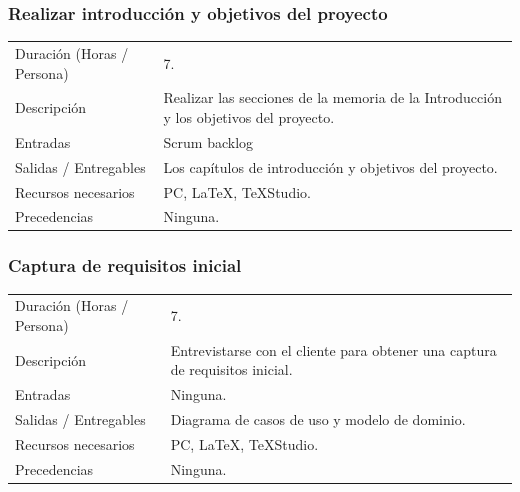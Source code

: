 \subsubsection{Realizar introducci\'{o}n y objetivos del proyecto}
\begin{table}[H]
    \begin{center}
        \begin{tabular}{l p{8cm}}
            Duraci\'{o}n (Horas / Persona)        & 7. \\ 
            Descripci\'{o}n                       & Realizar las secciones de la memoria de la Introducci\'{o}n y los
            objetivos del proyecto. \\
            Entradas                              & Scrum backlog  \\
            Salidas / Entregables                 & Los cap\'{i}tulos de introducci\'{o}n y objetivos del proyecto. \\
            Recursos necesarios                   & PC, \LaTeX, TeXStudio. \\
            Precedencias                          & Ninguna. \\
        \end{tabular}
    \end{center}
    
\end{table}

\subsubsection{Captura de requisitos inicial}
\begin{table}[H]
    \begin{center}
        \begin{tabular}{l p{8cm}}
            Duraci\'{o}n (Horas / Persona)        & 7. \\ 
            Descripci\'{o}n                       & Entrevistarse con el cliente para obtener
                                                    una captura de requisitos inicial. \\
            Entradas                              & Ninguna. \\
            Salidas / Entregables                 & Diagrama de casos de uso y modelo de dominio. \\
            Recursos necesarios                   & PC, \LaTeX, TeXStudio. \\
            Precedencias                          & Ninguna. \\
        \end{tabular}
    \end{center}
    
\end{table}

